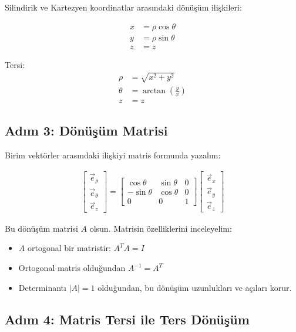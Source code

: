 \documentclass[11pt,letterpaper,twocolumn]{fenbil}
\begin{document}
Silindirik ve Kartezyen koordinatlar arasındaki dönüşüm ilişkileri:

\begin{align}
    x &= \rho \cos\theta \\
    y &= \rho \sin\theta \\
    z &= z
\end{align}

Tersi:
\begin{align}
    \rho &= \sqrt{x^2 + y^2} \\
    \theta &= \arctan\left(\frac{y}{x}\right) \\
    z &= z
\end{align}

\subsection*{Adım 3: Dönüşüm Matrisi}

Birim vektörler arasındaki ilişkiyi matris formunda yazalım:

\begin{align}
    \begin{bmatrix}
        \vec{e}_\rho \\
        \vec{e}_\theta \\
        \vec{e}_z
    \end{bmatrix} = 
    \begin{bmatrix}
        \cos\theta & \sin\theta & 0 \\
        -\sin\theta & \cos\theta & 0 \\
        0 & 0 & 1
    \end{bmatrix}
    \begin{bmatrix}
        \vec{e}_x \\
        \vec{e}_y \\
        \vec{e}_z
    \end{bmatrix}
\end{align}

Bu dönüşüm matrisi $A$ olsun. Matrisin özelliklerini inceleyelim:
\begin{itemize}
    \item $A$ ortogonal bir matristir: $A^T A = I$
    \item Ortogonal matris olduğundan $A^{-1} = A^T$
    \item Determinantı $|A| = 1$ olduğundan, bu dönüşüm uzunlukları ve açıları korur.
\end{itemize}

\subsection*{Adım 4: Matris Tersi ile Ters Dönüşüm}
\end{document}
